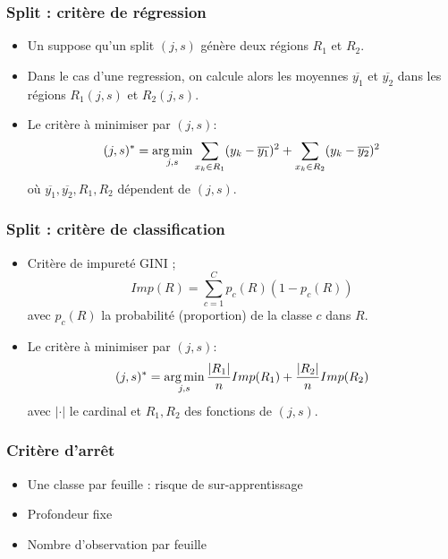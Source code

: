 \begin{frame}
  \frametitle{Split : critère de régression}
  \begin{itemize}
    \item Un suppose qu'un split $(j,s)$ génère deux régions $R_1$ et $R_2$. 
    \item Dans le cas d'une regression, on calcule alors les moyennes $\overline{y_1}$ et $\overline{y_2}$ dans les régions $R_1(j,s)$ et $R_2(j,s)$. 
    \item Le critère à minimiser par $(j,s)$:
    \begin{equation*}
    (j,s)^{\ast} = \operatorname*{arg\,min}_{j,s}\sum_{x_k \in R_1} (y_k-\overline{y_1})^2 + \sum_{x_k \in R_2}(y_k-\overline{y_2})^2
    \end{equation*}
    où $\overline{y_1}, \overline{y_2}, R_1, R_2$ dépendent de $(j,s)$. 
  \end{itemize}
\end{frame}

\begin{frame}
  \frametitle{Split : critère de classification}
  \begin{itemize}
    \item Critère de impureté GINI ; 
    \begin{equation*}
    Imp(R) = \sum_{c=1}^{C}p_c(R)(1-p_c(R))
    \end{equation*}
    avec $p_c(R)$ la probabilité (proportion) de la classe $c$ dans $R$.     
    \item Le critère à minimiser par $(j,s)$:
    \begin{equation*}
    (j,s)^{\ast} = \operatorname*{arg\,min}_{j,s}\frac{|R_1|}{n}Imp(R_1) + \frac{|R_2|}{n}Imp(R_2)
    \end{equation*}
    avec $|\cdot|$ le cardinal et $R_1, R_2$ des fonctions de $(j,s)$. 
  \end{itemize}
\end{frame}

\begin{frame}
  \frametitle{Critère d'arrêt}
  \begin{itemize}
    \item Une classe par feuille : risque de sur-apprentissage
    \item Profondeur fixe
    \item Nombre d'observation par feuille
  \end{itemize}
\end{frame}



